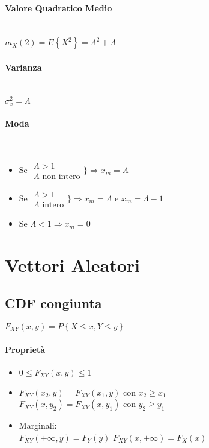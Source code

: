 \documentclass{article}
\begin{document}
\paragraph{Valore Quadratico Medio} ~\\
$m_X(2) = E \left\{ X^2 \right\} = \Lambda^2 + \Lambda$
\paragraph{Varianza} ~\\
$\sigma_x^2 = \Lambda$
\paragraph{Moda} ~\\
\begin{itemize}
    \item Se $\begin{matrix}
            \Lambda > 1 \\
            \Lambda \text{ non intero}
            \end{matrix}
            \Bigg\} \Rightarrow x_m = \Lambda$
    \item Se $\begin{matrix}
            \Lambda > 1 \\
            \Lambda \text{ intero}
            \end{matrix}
            \Bigg\} \Rightarrow x_m = \Lambda$ e $x_m = \Lambda - 1$
    \item Se $\Lambda < 1 \Rightarrow x_m = 0$ 
\end{itemize}

\section{Vettori Aleatori}

\subsection{CDF congiunta}
$F_{XY}(x,y) = P \left\{ X \leq x, Y \leq y \right\}$
\paragraph{Proprietà}
\begin{itemize}
    \item $0 \leq F_{XY}(x,y) \leq 1$
    \item $F_{XY}(x_2, y) = F_{XY}(x_1, y)$ con $x_2 \geq x_1$ \\
    $F_{XY}(x, y_2) = F_{XY}(x, y_1)$ con $y_2 \geq y_1$
    \item Marginali: \\
    $F_{XY}(+\infty, y) = F_Y(y)$
    $F_{XY}(x, +\infty) = F_X(x)$
\end{itemize}
\end{document}
